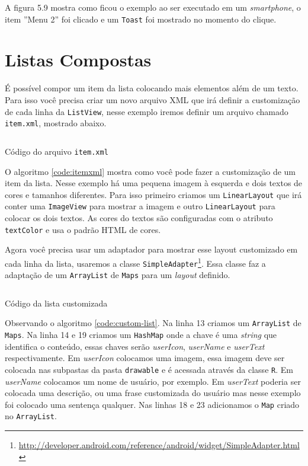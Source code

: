 \documentclass[a4paper,12pt,brazil]{book}
\begin{document}
\begin{singlespace}
A figura 5.9 mostra como ficou o exemplo ao ser executado em um \emph{smartphone}, o item ''Menu 2'' foi clicado e um \texttt{Toast} foi mostrado no momento do clique.

\section{Listas Compostas}
É possível compor um item da lista colocando mais elementos além de um texto. Para isso você precisa criar um novo arquivo XML que irá definir a customização de cada linha da \texttt{ListView}, nesse exemplo iremos definir um arquivo chamado \texttt{item.xml}, mostrado abaixo.


\begin{listing}[H]
\inputminted[linenos=true,fontsize=\small,frame=lines, framesep=2mm, tabsize=2,numbersep=5pt]{xml}{src/design/item.xml}
\caption{Código do arquivo \texttt{item.xml}}
\label{code:itemxml}
\end{listing}	

O algoritmo \ref{code:itemxml} mostra como você pode fazer a customização de um item da lista. Nesse exemplo há uma pequena imagem à esquerda e dois textos de cores e tamanhos diferentes. 
Para isso primeiro criamos um \texttt{LinearLayout} que irá conter uma \texttt{ImageView} para mostrar a imagem e outro \texttt{LinearLayout} para colocar os dois textos. As cores do textos são configuradas com o atributo \texttt{textColor} e usa o padrão HTML de cores.

Agora você precisa usar um adaptador para mostrar esse layout customizado em cada linha da lista, usaremos a classe \texttt{SimpleAdapter}\footnote{\href{http://developer.android.com/reference/android/widget/SimpleAdapter.html}{http://developer.android.com/reference/android/widget/SimpleAdapter.html}}. Essa classe faz a adaptação de um \texttt{ArrayList} de \texttt{Maps} para um \emph{layout} definido. 

\begin{listing}[H]
\inputminted[linenos=true,fontsize=\small,frame=lines, framesep=2mm, tabsize=2,numbersep=5pt]{java}{src/design/customlist.java}
\caption{Código da lista customizada}
\label{code:custom-list}
\end{listing}	

Observando o algoritmo \ref{code:custom-list}. Na linha 13 criamos um \texttt{ArrayList} de \texttt{Maps}. Na linha 14 e 19 criamos um \texttt{HashMap} onde a chave é uma \emph{string} que identifica o conteúdo, essas chaves serão \emph{userIcon}, \emph{userName} e \emph{userText} respectivamente. Em \emph{userIcon} colocamos uma imagem, essa imagem deve ser colocada nas subpastas da pasta \texttt{drawable} e é acessada através da classe \texttt{R}. Em \emph{userName} colocamos um nome de usuário, por exemplo. Em \emph{userText} poderia ser colocada uma descrição, ou uma frase customizada do usuário mas nesse exemplo foi colocado uma sentença qualquer. Nas linhas 18 e 23 adicionamos o \texttt{Map} criado no \texttt{ArrayList}.


\end{singlespace}
\end{document}
